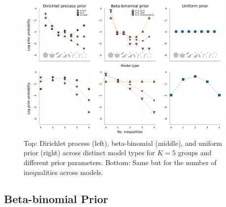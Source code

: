 \documentclass[11pt,a4paper]{article}
\theoremstyle{definition} %
\theoremstyle{case}
\newcommand{\FD}[1]{\textcolor{red}{Fabian: #1 }}
\begin{document}

\begin{figure}
    \centering
    \includegraphics[width = 0.95\textwidth]{figures/visualizePriors_2x3_new.pdf}
    \caption{Top: Dirichlet process (left), beta-binomial (middle), and uniform prior (right) across distinct model types for $K = 5$ groups and different prior parameters. Bottom: Same but for the number of inequalities across models.
    } %
    \label{fig:prior-comparison}
\end{figure}




\subsection{Beta-binomial Prior}
\end{document}
